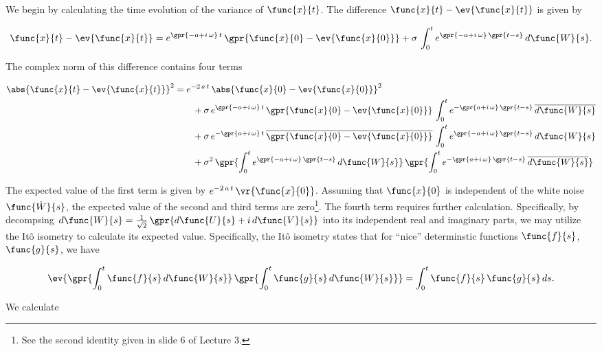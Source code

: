 We begin by calculating the time evolution of the variance of $\func{x}{t}$. The difference $\func{x}{t} - \ev{\func{x}{t}}$ is given by

\begin{equation}
	\func{x}{t} - \ev{\func{x}{t}} = e^{\gpr{-a + i\,\omega}\,t}\,\gpr{\func{x}{0} - \ev{\func{x}{0}}} + \sigma\,\int_{0}^{t} e^{\gpr{-a + i\,\omega}\,\gpr{t - s}}\,d\func{W}{s}.
\end{equation}

The complex norm of this difference contains four terms

\begin{align}
	\abs{\func{x}{t} - \ev{\func{x}{t}}}^2 &= e^{-2\,a\,t}\,\abs{\func{x}{0} - \ev{\func{x}{0}}}^2 \nonumber \\
			&\qquad + \sigma\,e^{\gpr{-a + i\,\omega}\,t}\,\gpr{\func{x}{0} - \ev{\func{x}{0}}}\,\int_{0}^{t} e^{-\gpr{a + i\,\omega}\,\gpr{t - s}}\,\overline{d\func{W}{s}} \nonumber \\
			&\qquad + \sigma\,e^{-\gpr{a + i\,\omega}\,t}\,\overline{\gpr{\func{x}{0} - \ev{\func{x}{0}}}}\,\int_{0}^{t} e^{\gpr{-a + i\,\omega}\,\gpr{t - s}}\,d\func{W}{s} \nonumber \\
			&\qquad + \sigma^2\,\gpr{\int_{0}^{t} e^{\gpr{-a + i\,\omega}\,\gpr{t - s}}\,d\func{W}{s}}\,\gpr{\int_{0}^{t} e^{-\gpr{a + i\,\omega}\,\gpr{t - s}}\,\overline{d\func{W}{s}}}
\end{align}

The expected value of the first term is given by $e^{-2\,a\,t}\,\vr{\func{x}{0}}$. Assuming that $\func{x}{0}$ is independent of the white noise $\func{\dot{W}}{s}$, the expected value of the second and third terms are zero\footnote{\label{fnt:int_against_dW}See the second identity given in slide 6 of Lecture 3.}. The fourth term requires further calculation. Specifically, by decompsing $d\func{W}{s} = \frac{1}{\sqrt{2}}\,\gpr{d\func{U}{s} + i\,d\func{V}{s}}$ into its independent real and imaginary parts, we may utilize the It\^{o} isometry to calculate its expected value. Specifically, the It\^{o} isometry states that for ``nice'' determinstic functions $\func{f}{s}$, $\func{g}{s}$, we have

\begin{equation}
	\ev{\gpr{\int_{0}^{t} \func{f}{s}\,d\func{W}{s}}\,\gpr{\int_{0}^{t} \func{g}{s}\,d\func{W}{s}}} = \int_{0}^{t} \func{f}{s}\,\func{g}{s}\,ds.
\end{equation}

We calculate

